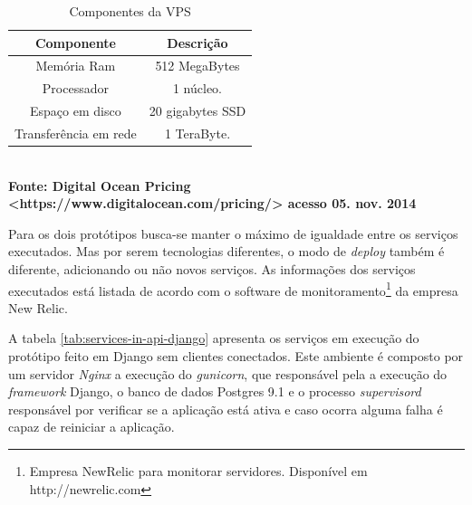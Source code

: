   \begin{table}[h]
    \centering
    \caption{\hspace{0.1cm} Componentes da VPS}
    \vspace{-0.3cm} %
    \label{tab:components-digital-ocean-vps}
    \begin{tabular}{c|c}
      \hline
      \textbf{Componente} & \textbf{Descrição} \\
      \hline
      Memória Ram & 512 MegaBytes \\
      Processador & 1 núcleo. \\
      Espaço em disco & 20 gigabytes SSD \\
      Transferência em rede & 1 TeraByte. \\
      \hline
    \end{tabular}
    \vspace{.1cm}  %
    \small
    {\footnotesize\\ \textbf{Fonte: Digital Ocean Pricing <https://www.digitalocean.com/pricing/> acesso 05. nov. 2014}}
  \end{table}

  Para os dois protótipos busca-se manter o máximo de igualdade entre os serviços executados. Mas por serem
  tecnologias diferentes, o modo de \textit{deploy} também é diferente, adicionando ou não novos serviços.
  As informações dos serviços executados está listada de acordo com o software de monitoramento\footnote[18]{ Empresa NewRelic para monitorar servidores. Disponível em http://newrelic.com}
  da empresa New Relic.

  A tabela \ref{tab:services-in-api-django} apresenta os serviços em execução do protótipo feito em Django sem clientes conectados.
  Este ambiente é composto por um servidor \textit{Nginx} a execução do \textit{gunicorn},
  que responsável pela a execução do \textit{framework} Django, o banco de dados Postgres 9.1 e o processo \textit{supervisord} responsável por
  verificar se a aplicação está ativa e caso ocorra alguma falha é capaz de reiniciar a aplicação.


